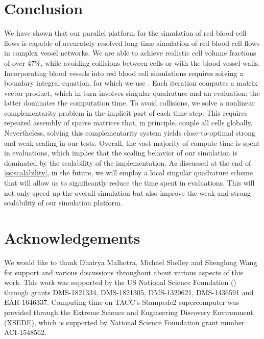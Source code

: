\section{Conclusion\label{sec:conclusion}}
We have shown that our parallel platform for the simulation of red
blood cell flows is capable of accurately resolved long-time
simulation of red blood cell flows in complex vessel networks. We are
able to achieve realistic cell volume fractions of over 47\%, while avoiding
collisions between cells or with the blood vessel
walls. Incorporating blood vessels into red blood cell
simulations requires solving a
boundary integral equation, for which we use \gmres.
Each \gmres iteration computes a matrix-vector product,
which in turn involves singular quadrature and an \fmm
evaluation; the latter dominates the computation time. To avoid collisions,
we solve a nonlinear complementarity problem in the implicit part of
each time step. This requires repeated assembly of sparse matrices that, in
principle, couple all cells globally. Nevertheless, solving this
complementarity system yields close-to-optimal strong
and weak scaling in our tests. Overall, the vast majority of compute
time is spent in \fmm evaluations, which implies that the scaling behavior of our
simulation is dominated by the scalability of the \fmm implementation.
As discussed at the end of \cref{ss:scalability}, in the
future, we will employ a local singular quadrature scheme that will
allow us to significantly reduce the time spent in \fmm evaluations. This
will not only speed up the overall simulation but
also improve the weak and strong scalability of our simulation platform.







\section{Acknowledgements}
We would like to thank 
Dhairya Malhotra, 
Michael Shelley and 
Shenglong Wang
for support and various discussions throughout about various aspects of this work.
This work was supported by the US National Science Foundation
() through grants DMS-1821334, DMS-1821305, DMS-1320621, DMS-1436591 and EAR-1646337.
Computing time on TACC's Stampede2 supercomputer was provided through the Extreme Science and
Engineering Discovery Environment (XSEDE), which is supported by
National Science Foundation grant number ACI-1548562.

